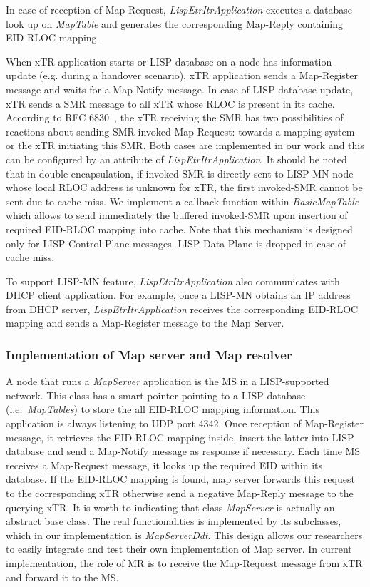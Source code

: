 In case of reception of Map-Request, \emph{LispEtrItrApplication} executes a database look up on \emph{MapTable} and generates the corresponding Map-Reply containing EID-RLOC mapping.

When xTR application starts or LISP database on a node has information update (e.g. during a handover scenario), xTR application sends a Map-Register message and waits for a Map-Notify message. In case of LISP database update, xTR sends a SMR message to all xTR whose RLOC is present in its cache. %
According to RFC 6830~\cite{rfc6830}, the xTR receiving the SMR has two possibilities of reactions about sending SMR-invoked Map-Request:  towards a mapping system or the xTR initiating this SMR. Both cases are implemented in our work and this can be configured by an attribute of \emph{LispEtrItrApplication}. It should be noted that in double-encapsulation, if invoked-SMR is directly sent to LISP-MN node whose local RLOC address is unknown for xTR, the first invoked-SMR cannot be sent due to cache miss. We implement a callback function within \emph{BasicMapTable} which allows to send immediately the buffered invoked-SMR upon insertion of required EID-RLOC mapping into cache. Note that this mechanism is designed only for LISP Control Plane messages. LISP Data Plane is dropped in case of cache miss.

To support LISP-MN feature, \emph{LispEtrItrApplication} also communicates with DHCP client application. For example, once a LISP-MN obtains an IP address from DHCP server, \emph{LispEtrItrApplication} receives the corresponding EID-RLOC mapping and sends a Map-Register message to the Map Server.

\subsubsection{Implementation of Map server and Map resolver}
A node that runs a \emph{MapServer} application is the MS in a LISP-supported network. This class has a smart pointer pointing to a LISP database (i.e.~\emph{MapTables}) to store the all EID-RLOC mapping information. This application 
is always listening to UDP port 4342. Once reception of Map-Register message, it retrieves the EID-RLOC mapping inside, insert the latter into LISP database and send a Map-Notify message as response if necessary.
Each time MS receives a Map-Request message, it looks up the required EID within its database. If the EID-RLOC mapping is found, map server forwards this request to the corresponding xTR otherwise send a negative Map-Reply message to the querying xTR. 
It is worth to indicating that class \emph{MapServer} is actually an abstract base class. The real functionalities is implemented by its subclasses, which in our implementation is \emph{MapServerDdt}. This design allows our researchers to easily integrate and test their own implementation of Map server.
In current implementation, the role of MR is to receive the Map-Request message from xTR and forward it to the MS.

